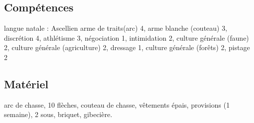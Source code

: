 \documentclass[10pt,a4paper]{article}
\begin{document}
\subsection{Compétences}
langue natale : Ascellien
arme de traits(arc) 4, arme blanche (couteau) 3, discrétion 4, athlétisme 3, négociation 1, intimidation 2, culture générale (faune) 2, culture générale (agriculture) 2, dressage 1, culture générale (forêts) 2, pistage 2
\subsection{Matériel}
arc de chasse, 10 flèches, couteau de chasse, vêtements épais, provisions (1 semaine), 2 sous, briquet, gibecière.
\end{document}
